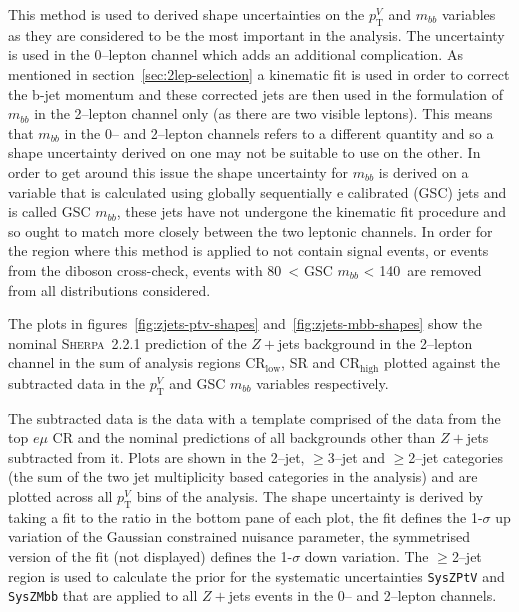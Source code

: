 This method is used to derived shape uncertainties on the $p_{\mathrm{T}}^V$ and $m_{bb}$
variables as they are considered to be the most important in the analysis. The
uncertainty is used in the 0--lepton channel which adds an additional
complication. As mentioned in section~\ref{sec:2lep-selection} a kinematic fit
is used in order to correct the b-jet momentum and these corrected jets are then
used in the formulation of $m_{bb}$ in the 2--lepton channel only (as there are
two visible leptons). This means that $m_{bb}$ in the 0-- and 2--lepton channels
refers to a different quantity and so a shape uncertainty derived on one may not
be suitable to use on the other. In order to get around this issue the shape
uncertainty for $m_{bb}$ is derived on a variable that is calculated using
globally sequentially e
calibrated (GSC) jets and is called GSC $m_{bb}$, these jets have not undergone
the kinematic fit procedure and so ought to match more closely between the two
leptonic channels. In order for the region where this method is applied to not
contain signal events, or events from the diboson cross-check, events with
80~\GeV < GSC $m_{bb}$ < 140~\GeV are removed from all distributions considered.

The plots in figures~\ref{fig:zjets-ptv-shapes} and~\ref{fig:zjets-mbb-shapes}
show the nominal \textsc{Sherpa}~2.2.1 prediction of the $Z+$jets background in
the 2--lepton channel in the sum of analysis regions CR$_{\text{low}}$, SR and
CR$_{\text{high}}$ plotted against the subtracted data in the $p_{\mathrm{T}}^V$ and GSC
$m_{bb}$ variables respectively.


The subtracted data is the data with a template comprised of the data from the
top $e\mu$ CR and the nominal predictions of all backgrounds other than $Z+$jets
subtracted from it. Plots are shown in the 2--jet, $\geq$3--jet and $\geq$2--jet
categories (the sum of the two jet multiplicity based categories in the
analysis) and are plotted across all $p_{\mathrm{T}}^V$ bins of the analysis. The shape
uncertainty is derived by taking a fit to the ratio in the bottom pane of each
plot, the fit defines the 1-$\sigma$ up variation of the Gaussian constrained
nuisance parameter, the symmetrised version of the fit (not displayed) defines
the 1-$\sigma$ down variation. The $\geq$2--jet region is used to calculate the
prior for the systematic uncertainties \texttt{SysZPtV} and \texttt{SysZMbb}
that are applied to all $Z+$jets events in the 0-- and 2--lepton channels.

